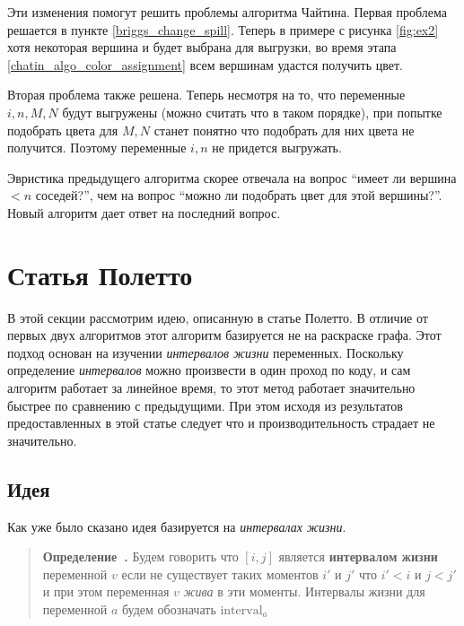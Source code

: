\documentclass[12pt]{article}
\newcounter{definition}
\newenvironment{definition}[1][]{\refstepcounter{definition}\par\medskip\noindent\begin{quote}
\textbf{Определение~\thedefinition. #1}\rmfamily}{\end{quote}\medskip}
\begin{document}
Эти изменения помогут решить проблемы алгоритма Чайтина. Первая проблема решается в пункте \ref{briggs_change_spill}.
Теперь в примере с рисунка \ref{fig:ex2} хотя некоторая вершина и будет выбрана для выгрузки, во время этапа \ref{chatin_algo_color_assignment}
всем вершинам удастся получить цвет.

Вторая проблема также решена. Теперь несмотря на то, что переменные $i, n, M, N$ будут выгружены (можно считать что в таком
порядке), при попытке подобрать цвета для $M, N$ станет понятно что подобрать для них цвета не получится.
Поэтому переменные $i, n$ не придется выгружать.

Эвристика предыдущего алгоритма скорее отвечала на
вопрос ``имеет ли вершина $< n$ соседей?'', чем на вопрос ``можно ли подобрать цвет для этой вершины?''. Новый
алгоритм дает ответ на последний вопрос.

\section{Статья Полетто}

В этой секции рассмотрим идею, описанную в статье Полетто. В отличие от первых двух алгоритмов
этот алгоритм базируется не на раскраске графа. Этот подход основан на изучении \textit{интервалов жизни}
переменных. Поскольку определение \textit{интервалов} можно произвести в один проход по коду, и сам алгоритм
работает за линейное время, то этот метод работает значительно быстрее по сравнению с предыдущими.
При этом исходя из результатов предоставленных в этой статье следует что и производительность
страдает не значительно.

\subsection{Идея}

Как уже было сказано идея базируется на \textit{интервалах жизни}.

\begin{definition}
    Будем говорить что $[i, j]$ является \textbf{интервалом жизни} переменной $v$ если не существует таких
    моментов $i'$ и $j'$ что $i' < i$ и $j < j'$ и при этом переменная $v$ \textit{жива} в эти моменты.
    Интервалы жизни для переменной $a$ будем обозначать $\text{interval}_a$
\end{definition}
\end{document}
